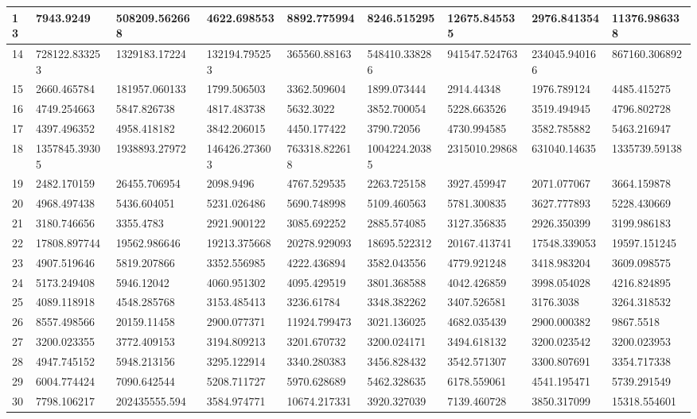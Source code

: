 \begin{table}
\begin{tabular}{|p{0.8cm}|p{1.6cm}|p{1.6cm}|p{1.6cm}|p{1.6cm}|p{1.6cm}|p{1.6cm}|p{1.6cm}|p{1.6cm}|}
13  & 7943.9249 & 508209.562668 & 4622.698553 & 8892.775994 & 8246.515295 & 12675.845535 & 2976.841354 & 11376.986338 \\ 
 \hline
14  & 728122.833253 & 1329183.17224 & 132194.795253 & 365560.88163 & 548410.338286 & 941547.524763 & 234045.940166 & 867160.306892 \\ 
 \hline
15  & 2660.465784 & 181957.060133 & 1799.506503 & 3362.509604 & 1899.073444 & 2914.44348 & 1976.789124 & 4485.415275 \\ 
 \hline
16  & 4749.254663 & 5847.826738 & 4817.483738 & 5632.3022 & 3852.700054 & 5228.663526 & 3519.494945 & 4796.802728 \\ 
 \hline
17  & 4397.496352 & 4958.418182 & 3842.206015 & 4450.177422 & 3790.72056 & 4730.994585 & 3582.785882 & 5463.216947 \\ 
 \hline
18  & 1357845.39305 & 1938893.27972 & 146426.273603 & 763318.822618 & 1004224.20385 & 2315010.29868 & 631040.14635 & 1335739.59138 \\ 
 \hline
19  & 2482.170159 & 26455.706954 & 2098.9496 & 4767.529535 & 2263.725158 & 3927.459947 & 2071.077067 & 3664.159878 \\ 
 \hline
20  & 4968.497438 & 5436.604051 & 5231.026486 & 5690.748998 & 5109.460563 & 5781.300835 & 3627.777893 & 5228.430669 \\ 
 \hline
21  & 3180.746656 & 3355.4783 & 2921.900122 & 3085.692252 & 2885.574085 & 3127.356835 & 2926.350399 & 3199.986183 \\ 
 \hline
22  & 17808.897744 & 19562.986646 & 19213.375668 & 20278.929093 & 18695.522312 & 20167.413741 & 17548.339053 & 19597.151245 \\ 
 \hline
23  & 4907.519646 & 5819.207866 & 3352.556985 & 4222.436894 & 3582.043556 & 4779.921248 & 3418.983204 & 3609.098575 \\ 
 \hline
24  & 5173.249408 & 5946.12042 & 4060.951302 & 4095.429519 & 3801.368588 & 4042.426859 & 3998.054028 & 4216.824895 \\ 
 \hline
25  & 4089.118918 & 4548.285768 & 3153.485413 & 3236.61784 & 3348.382262 & 3407.526581 & 3176.3038 & 3264.318532 \\ 
 \hline
26  & 8557.498566 & 20159.11458 & 2900.077371 & 11924.799473 & 3021.136025 & 4682.035439 & 2900.000382 & 9867.5518 \\ 
 \hline
27  & 3200.023355 & 3772.409153 & 3194.809213 & 3201.670732 & 3200.024171 & 3494.618132 & 3200.023542 & 3200.023953 \\ 
 \hline
28  & 4947.745152 & 5948.213156 & 3295.122914 & 3340.280383 & 3456.828432 & 3542.571307 & 3300.807691 & 3354.717338 \\ 
 \hline
29  & 6004.774424 & 7090.642544 & 5208.711727 & 5970.628689 & 5462.328635 & 6178.559061 & 4541.195471 & 5739.291549 \\ 
 \hline
30  & 7798.106217 & 202435555.594 & 3584.974771 & 10674.217331 & 3920.327039 & 7139.460728 & 3850.317099 & 15318.554601 \\ 
 \hline


 \end{tabular}
\end{table}
